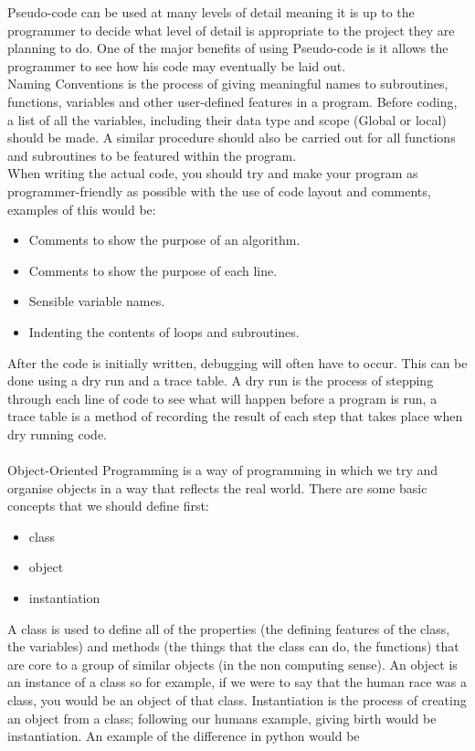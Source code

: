   Pseudo-code can be used at many levels of detail meaning it is up to the programmer to decide what level of detail is appropriate to the project they are planning to do. One of the major benefits of using Pseudo-code is it allows the programmer to see how his code may eventually be laid out.\\
  Naming Conventions is the process of giving meaningful names to subroutines, functions, variables and other user-defined features in a program. Before coding, a list of all the variables, including their data type and scope (Global or local) should be made. A similar procedure should also be carried out for all functions and subroutines to be featured within the program.\\
  When writing the actual code, you should try and make your program as programmer-friendly  as possible with the use of code layout and comments, examples of this would be:
  \begin{itemize}
    \setlength\itemsep{0cm}
    \item Comments to show the purpose of an algorithm.
    \item Comments to show the purpose of each line.
    \item Sensible variable names.
    \item Indenting the contents of loops and subroutines.
  \end{itemize}
  After the code is initially written, debugging will often have to occur. This can be done using a dry run and a trace table. A dry run is the process of stepping through each line of code to see what will happen before a program is run, a trace table is a method of recording the result of each step that takes place when dry running code.\\ \\
  \noindent
  Object-Oriented Programming is a way of programming in which we try and organise objects in a way that reflects the real world. There are some basic concepts that we should define first:
  \begin{itemize}
    \setlength\itemsep{0cm}
  	\item class
  	\item object
  	\item instantiation
  \end{itemize}
  A class is used to define all of the properties (the defining features of the class, the variables) and methods (the things that the class can do, the functions) that are core to a group of similar objects (in the non computing sense). An object is an instance of a class so for example, if we were to say that the human race was a class, you would be an object of that class. Instantiation is the process of creating an object from a class; following our humans example, giving birth would be instantiation. An example of the difference in python would be
